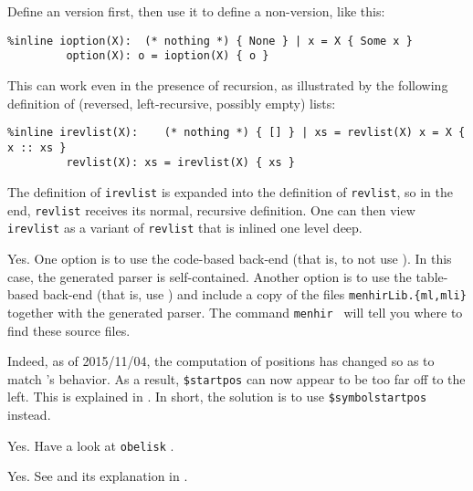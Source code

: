 \documentclass[onecolumn,11pt,nocopyrightspace,preprint]{sigplanconf}
\begin{document}
 Define an \dinline version first, then use it to
define a non-\dinline version, like this:
\begin{verbatim}
%inline ioption(X):  (* nothing *) { None } | x = X { Some x }
         option(X): o = ioption(X) { o }
\end{verbatim}
This can work even in the presence of recursion, as illustrated by the
following definition of (reversed, left-recursive, possibly empty) lists:
\begin{verbatim}
%inline irevlist(X):    (* nothing *) { [] } | xs = revlist(X) x = X { x :: xs }
         revlist(X): xs = irevlist(X) { xs }
\end{verbatim}
The definition of \verb+irevlist+ is expanded into the definition of \verb+revlist+,
so in the end, \verb+revlist+ receives its normal, recursive definition. One can
then view \verb+irevlist+ as a variant of \verb+revlist+ that is inlined one level
deep.

Yes. One option is to use the code-based back-end (that is, to not
use \otable). In this case, the generated parser is self-contained. Another
option is to use the table-based back-end (that is, use \otable) and include a
copy of the files \verb+menhirLib.{ml,mli}+ together with the generated
parser. The command \texttt{menhir \osuggestmenhirlib} will tell you where to
find these source files.

Indeed, as of 2015/11/04, the computation of positions has changed so as to match \ocamlyacc's
behavior. As a result, \texttt{\$startpos} can now appear to be too far off to the left. This is explained
in . In short, the solution is to use \verb+$symbolstartpos+ instead.

Yes. Have a look at \texttt{obelisk} \cite{obelisk}.

 Yes.
See  and its explanation in .

\end{document}
